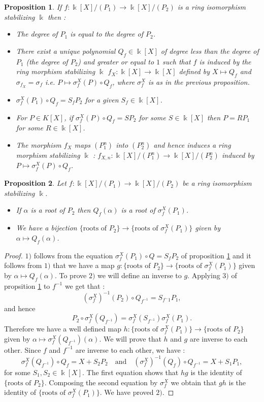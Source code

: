 \documentclass[10pt,a4paper]{amsart}
\newtheorem{proposition}{Proposition}
\newcommand{\K}{ {\Bbbk} }
\newcommand{\KP}{{\Bbbk[X]/(P_1)}}
\newcommand{\KPP}{{\Bbbk[X]/(P_2)}}
\newcommand{\KPPn}{{\Bbbk[X]/(P_2^n)}}
\newcommand{\KPn}{{\Bbbk[X]/(P_1^n)}}
\begin{document}
\begin{proposition}\label{P1}
If $f: \KP\to \KPP$ is a ring isomorphism stabilizing $\K$ then :
\begin{itemize}
\item[1)] The degree of $P_1$ is equal to the degree of $P_2$.
\item[2)] There exist a unique polynomial $Q_f\in \K[X]$ of degree less than the degree of $P_1$ (the degree of $P_2$) and greater or equal to $1$ such that $f$ is induced by the ring morphism stabilizing $\K$ $f_X: \K[X]\to \K[X]$ defined by $X\mapsto Q_f  $ and $\sigma_{f_X}=\sigma_f$ i.e. $P\mapsto \sigma_{f}^X(P)\circ Q_f$, where $\sigma_f^X$ is as in the previous proposition.
\item[3)] $\sigma_f^X(P_1)\circ Q_f=S_fP_2$ for a given $S_f \in \K[X]$.
\item[4)] For $P\in K[X]$, if $\sigma_f^X(P)\circ Q_f= SP_2$ for some $S\in \K[X]$ then $P=RP_1$ for some $R\in \K[X]$.  
\item[5)] The morphism $f_X$ maps $(P_1^n)$ into $(P_2^n)$ and hence induces a ring morphism stabilizing $\K$ :  $f_{X,n}:\KPn\to \KPPn$ induced by $P\mapsto \sigma_f^X(P)\circ Q_f$.
\end{itemize}
\end{proposition}

\begin{proposition}
Let $f: \KP\to \KPP$ be a ring isomorphism stabilizing $\K$.
\begin{itemize}
\item[1)] If $\alpha$ is a root of $P_2$ then $Q_f(\alpha)$ is a root of $\sigma_f^X(P_1)$.
\item[2)] We have a bijection $\{\text{roots of } P_2\}\rightarrow \{\text{roots of } \sigma_f^X(P_1)\}$ given by $\alpha \mapsto Q_f(\alpha)$.
\end{itemize}
\end{proposition}

\begin{proof}
$1)$ follows from the equation $\sigma_f^X(P_1)\circ Q= S_f P_2$ of proposition \ref{P1} and it follows from $1)$ that we have a map $g: \{\text{roots of } P_2\}\rightarrow \{\text{roots of } \sigma_f^X(P_1)\}$ given by $\alpha \mapsto Q_f(\alpha)$. To prove $2)$ we will define an inverse to $g$. Applying $3)$ of propsition \ref{P1} to $f^{-1}$ we get that :
$$(\sigma_f^X)^{-1}(P_2)\circ Q_{f^{-1}}=S_{f^-1}P_1,$$
and hence $$P_2 \circ \sigma_f^X(Q_{f^{-1}})=\sigma_f^X (S_{f^{-1}})\sigma_f^X (P_1).$$
Therefore we have a well defined map  $h:\{\text{roots of } \sigma_f^X(P_1)\} \to \{\text{roots of } P_2\}$ given by $\alpha\mapsto \sigma_f^X(Q_{f^{-1}})(\alpha)$. We will prove that $h$ and $g$ are inverse to each other.  Since $f$ and $f^{-1}$ are inverse to each other, we have :
$$ \sigma_f^X(Q_{f^{-1}})\circ Q_f = X +S_2P_2 \quad \text{and} \quad (\sigma_f^X)^{-1}(Q_f)\circ Q_{f^{-1}}=X+S_1 P_1,$$ 
for some $S_1,S_2 \in \K[X]$. The first equation shows that $hg$ is the identity of $\{\text{roots of } P_2\}$. Composing the second equation by $\sigma_f^X$ we obtain that $gh$ is the identity of $\{\text{roots of } \sigma_f^X(P_1)\}$. We have proved $2)$.
\end{proof}
\end{document}
